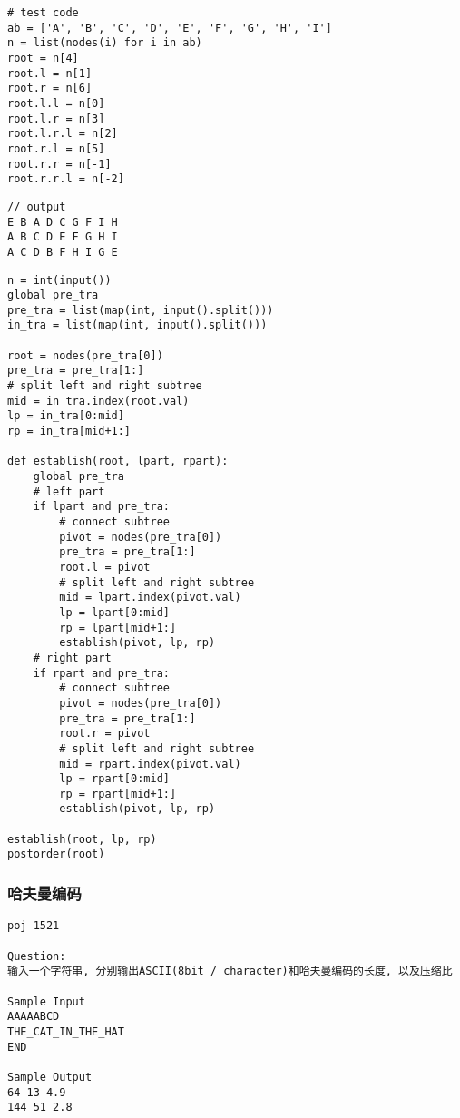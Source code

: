 \documentclass[../main]{subfiles}
\begin{document}
\begin{lstlisting}[style = Python]
# test code
ab = ['A', 'B', 'C', 'D', 'E', 'F', 'G', 'H', 'I']
n = list(nodes(i) for i in ab)
root = n[4]
root.l = n[1]
root.r = n[6]
root.l.l = n[0]
root.l.r = n[3]
root.l.r.l = n[2]
root.r.l = n[5]
root.r.r = n[-1]
root.r.r.l = n[-2]
\end{lstlisting}

\begin{lstlisting}[style = Pseudocode]
// output
E B A D C G F I H 
A B C D E F G H I 
A C D B F H I G E 
\end{lstlisting}

\begin{lstlisting}[style = Python]
n = int(input())
global pre_tra
pre_tra = list(map(int, input().split()))
in_tra = list(map(int, input().split()))

root = nodes(pre_tra[0])
pre_tra = pre_tra[1:]
# split left and right subtree
mid = in_tra.index(root.val)
lp = in_tra[0:mid]
rp = in_tra[mid+1:]

def establish(root, lpart, rpart):
    global pre_tra
    # left part
    if lpart and pre_tra:
        # connect subtree
        pivot = nodes(pre_tra[0])
        pre_tra = pre_tra[1:]
        root.l = pivot
        # split left and right subtree
        mid = lpart.index(pivot.val)
        lp = lpart[0:mid]
        rp = lpart[mid+1:]
        establish(pivot, lp, rp)
    # right part
    if rpart and pre_tra:
        # connect subtree
        pivot = nodes(pre_tra[0])
        pre_tra = pre_tra[1:]
        root.r = pivot
        # split left and right subtree
        mid = rpart.index(pivot.val)
        lp = rpart[0:mid]
        rp = rpart[mid+1:]
        establish(pivot, lp, rp)

establish(root, lp, rp)
postorder(root)
\end{lstlisting}

\subsubsection{哈夫曼编码}

\begin{verbatim}
poj 1521

Question:
输入一个字符串, 分别输出ASCII(8bit / character)和哈夫曼编码的长度, 以及压缩比

Sample Input
AAAAABCD
THE_CAT_IN_THE_HAT
END

Sample Output
64 13 4.9
144 51 2.8
\end{verbatim}
\end{document}
